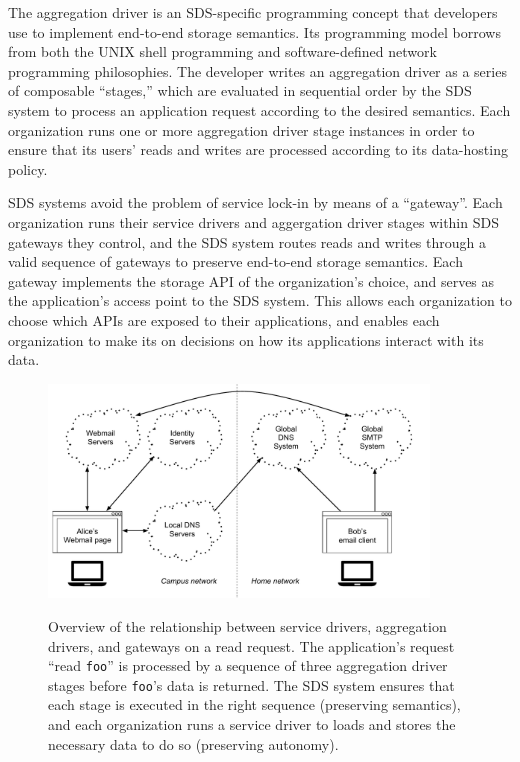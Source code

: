 The aggregation driver is an SDS-specific programming concept that developers
use to implement end-to-end storage semantics.  Its
programming model borrows from both the UNIX shell programming and software-defined
network programming philosophies.  The developer writes an aggregation driver as a
series of composable ``stages,'' which are evaluated in sequential order by the
SDS system to process an application request according to the desired semantics.
Each organization runs one or more aggregation driver stage instances in order to ensure
that its users' reads and writes are processed according to its data-hosting
policy.

SDS systems avoid the problem of service lock-in by means of a ``gateway''.
Each organization runs their service drivers and aggergation driver stages
within SDS gateways they control, and the SDS system routes reads and writes
through a valid sequence of gateways to preserve end-to-end storage semantics.
Each gateway implements the storage API of the
organization's choice, and serves as the application's access point to the SDS
system.  This allows each organization to choose which APIs are exposed to their
applications, and enables each organization to make its on decisions on how its
applications interact with its data.

\begin{figure}[h]
   \caption{Overview of the relationship between service drivers, aggregation
   drivers, and gateways on a read request.  The application's request ``read \texttt{foo}'' is
   processed by a sequence of three aggregation driver stages before
   \texttt{foo}'s data is returned.  The SDS system ensures that each stage is
   executed in the right sequence (preserving semantics),
   and each organization runs a service driver to loads and stores the
   necessary data to do so (preserving autonomy).}
   \centering
   \includegraphics[width=0.9\textwidth,page=33]{figures/dissertation-figures}
   \label{fig:chap1-sds-implementation-overview}
\end{figure}

